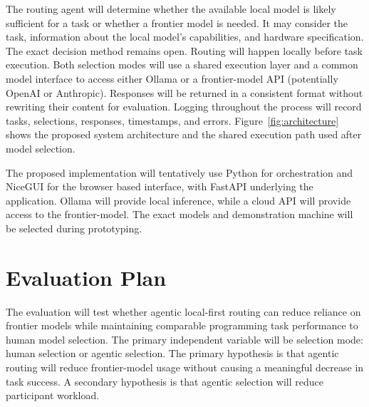 \documentclass[sigconf,nonacm]{acmart}
\begin{document}
The routing agent will determine whether the available local model is likely sufficient for a task or whether a frontier model is needed. It may consider the task, information about the local model’s capabilities, and hardware specification. The exact decision method remains open. Routing will happen locally before task execution. Both selection modes will use a shared execution layer and a common model interface to access either Ollama or a frontier-model API (potentially OpenAI or Anthropic). Responses will be returned in a consistent format without rewriting their content for evaluation. Logging throughout the process will record tasks, selections, responses, timestamps, and errors. Figure~\ref{fig:architecture} shows the proposed system architecture and the shared execution path used after model selection.

The proposed implementation will tentatively use Python for orchestration and NiceGUI for the browser based interface, with FastAPI underlying the application. Ollama will provide local inference, while a cloud API will provide access to the frontier-model. The exact models and demonstration machine will be selected during prototyping.


\section{Evaluation Plan}
\noindent
The evaluation will test whether agentic local-first routing can reduce
reliance on frontier models while maintaining comparable programming task
performance to human model selection. The primary independent variable will
be selection mode: human selection or agentic selection. The primary
hypothesis is that agentic routing will reduce frontier-model usage without
causing a meaningful decrease in task success. A secondary hypothesis is that
agentic selection will reduce participant workload.
\end{document}
